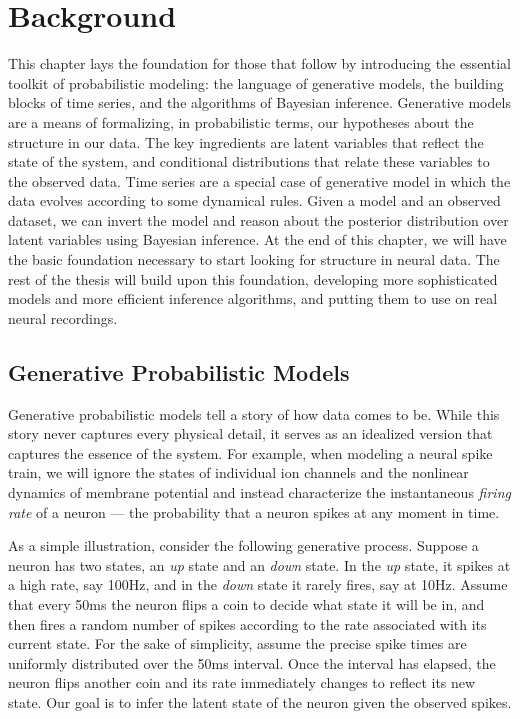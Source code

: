 
\chapter{Background}
This chapter lays the foundation for those that follow by introducing 
the essential toolkit of probabilistic modeling: the language of 
generative models, the building blocks of time series, and the algorithms
of Bayesian inference.  Generative models are a means of formalizing, 
in probabilistic terms, our hypotheses about the structure in our 
data. The key ingredients are latent variables that reflect the state 
of the system, and conditional distributions that relate these variables 
to the observed data. Time series are a special case of generative model
in which the data evolves according to some dynamical rules. Given a 
model and an observed dataset, we can invert the model and reason about 
the posterior distribution over latent variables using Bayesian inference. 
At the end of this chapter, we will have the basic foundation necessary 
to start looking for structure in neural data. The rest of the thesis 
will build upon this foundation, developing more sophisticated models
 and more efficient inference algorithms, and putting them to use on 
real neural recordings.

\section{Generative Probabilistic Models}
\label{sec:generative_models}
Generative probabilistic models tell a story of how data comes to be. 
While this story never captures every physical detail, it serves as an 
idealized version that captures the essence of the system. For example, when
modeling a neural spike train, we will ignore the states of individual ion 
channels and the nonlinear dynamics of membrane potential and instead 
characterize the instantaneous \emph{firing rate} of a neuron --- the 
probability that a neuron spikes at any moment in time. 

As a simple illustration, consider the following generative
process. Suppose a neuron has two states, an \emph{up} state and an
\emph{down} state. In the \emph{up} state, it spikes at a high
rate, say 100Hz, and in the \emph{down} state it rarely fires, say at 10Hz.
Assume that every 50ms the neuron flips a coin to decide what state it
will be in, and then fires a random number of spikes according to the
rate associated with its current state. For the sake of simplicity, 
assume the precise spike times are uniformly distributed over the 50ms
interval. Once the interval has elapsed, the neuron
flips another coin and its rate immediately changes to reflect its new
state.   Our goal is to infer the latent state of
the neuron given the observed spikes.

